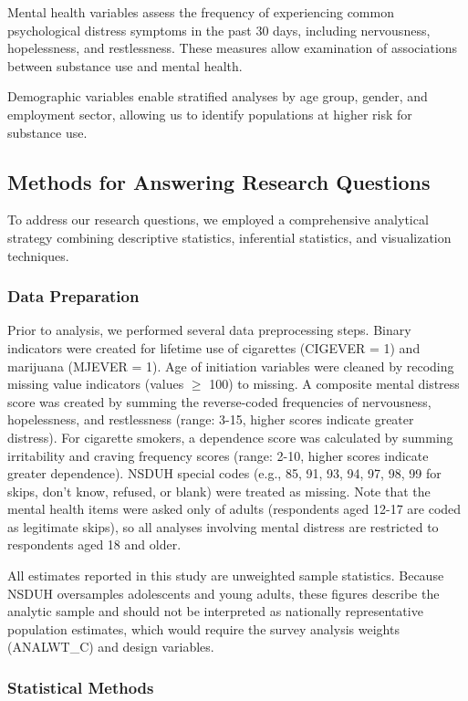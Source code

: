 \documentclass[conference]{IEEEtran}
\begin{document}
Mental health variables assess the frequency of experiencing common psychological distress symptoms in the past 30 days, including nervousness, hopelessness, and restlessness. These measures allow examination of associations between substance use and mental health.

Demographic variables enable stratified analyses by age group, gender, and employment sector, allowing us to identify populations at higher risk for substance use.

\subsection{Methods for Answering Research Questions}

To address our research questions, we employed a comprehensive analytical strategy combining descriptive statistics, inferential statistics, and visualization techniques.

\subsubsection{Data Preparation}

Prior to analysis, we performed several data preprocessing steps. Binary indicators were created for lifetime use of cigarettes (CIGEVER = 1) and marijuana (MJEVER = 1). Age of initiation variables were cleaned by recoding missing value indicators (values $\geq$ 100) to missing. A composite mental distress score was created by summing the reverse-coded frequencies of nervousness, hopelessness, and restlessness (range: 3-15, higher scores indicate greater distress). For cigarette smokers, a dependence score was calculated by summing irritability and craving frequency scores (range: 2-10, higher scores indicate greater dependence). NSDUH special codes (e.g., 85, 91, 93, 94, 97, 98, 99 for skips, don't know, refused, or blank) were treated as missing. Note that the mental health items were asked only of adults (respondents aged 12-17 are coded as legitimate skips), so all analyses involving mental distress are restricted to respondents aged 18 and older.

All estimates reported in this study are unweighted sample statistics. Because NSDUH oversamples adolescents and young adults, these figures describe the analytic sample and should not be interpreted as nationally representative population estimates, which would require the survey analysis weights (ANALWT\_C) and design variables.

\subsubsection{Statistical Methods}
\end{document}
